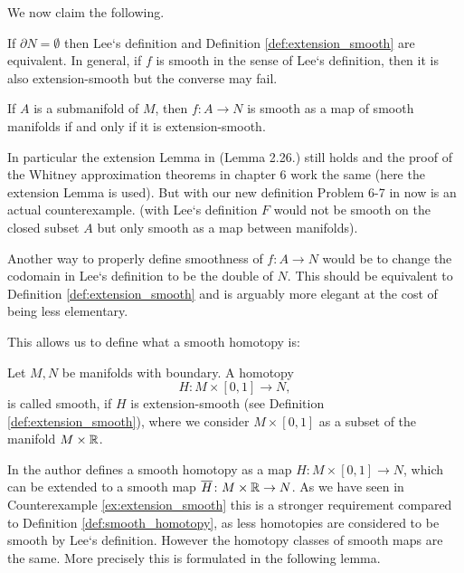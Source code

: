 We now claim the following.

\begin{lemma}
    \label{lem:smoothness_arbitrary_subsets_1}
    If $\partial N = \emptyset$ then Lee`s definition and Definition \ref{def:extension_smooth} are equivalent. In general, if $f$ is smooth in the sense of Lee`s definition, then it is also extension-smooth but the converse may fail.
\end{lemma}

\begin{lemma}
    If $A$ is a submanifold of $M$, then $f \colon A \to N$ is smooth as a map of smooth manifolds if and only if it is extension-smooth.
\end{lemma}

In particular the extension Lemma in \cite{lee2011smooth} (Lemma 2.26.) still holds and the proof of the Whitney approximation theorems in chapter 6 work the same (here the extension Lemma is used). But with our new definition Problem 6-7 in \cite{lee2011smooth} now is an actual counterexample. (with Lee`s definition $F$ would not be smooth on the closed subset $A$ but only smooth as a map between manifolds).

Another way to properly define smoothness of $f \colon A \to N$ would be to change the codomain in Lee`s definition to be the double of $N$. This should be equivalent to Definition \ref{def:extension_smooth} and is arguably more elegant at the cost of being less elementary. 


\noindent This allows us to define what a smooth homotopy is:
\begin{definition}
    \label{def:smooth_homotopy}
    Let $M,N$ be manifolds with boundary. A homotopy
    \[
        H \colon M \times [0,1] \to N,
    \]
    is called smooth, if $H$ is extension-smooth (see Definition \ref{def:extension_smooth}), where we consider $M \times [0,1]$ as a subset of the manifold $M \times \mathbb{R}$.
\end{definition} 

In \cite{lee2011smooth} the author defines a smooth homotopy as a map $H \colon M \times [0,1] \to N$, which can be extended to a smooth map $\overline{H} \colon M \times \mathbb{R} \to N$.
As we have seen in Counterexample \ref{ex:extension_smooth} this is a stronger requirement compared to Definition \ref{def:smooth_homotopy}, as less homotopies are considered to be smooth by Lee`s definition. However the homotopy classes of smooth maps are the same. More precisely this is formulated in the following lemma.


